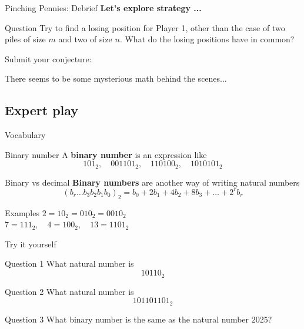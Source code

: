 \documentclass{beamer}
\begin{document}
\begin{frame}{Pinching Pennies: Debrief}
\pause
\textbf{Let's explore strategy ...}
\pause
  \begin{block}{Question}
    Try to find a losing position for Player 1, other than the case of two piles of size $m$ and two of size $n$.
    What do the losing positions have in common?
  \end{block}
\pause
  \begin{block}{Submit your conjecture:}
    \begin{center}
    \end{center}
  \end{block}
\pause
  \begin{center}
    There seems to be some mysterious math behind the scenes...
  \end{center}
\end{frame}

\subsection{Expert play}

\begin{frame}{Vocabulary}
\pause
  \begin{block}{Binary number}
    A \textbf{binary number} is an expression like
      $$101_2,\quad001101_2,\quad 110100_2,\quad 1010101_2$$
  \end{block}
\pause
  \begin{block}{Binary vs decimal}
    \textbf{Binary numbers} are another way of writing natural numbers
      $$(b_r\dots b_3b_2b_1b_0)_2 = b_0 + 2b_1 + 4b_2 + 8b_3 + \dots + 2^rb_r$$
  \end{block}
\pause
  \begin{block}{Examples}
\pause
    $2 = 10_2 = 010_2 = 0010_2$\\
\pause
    $7 = 111_2,\quad 4 = 100_2, \quad 13 = 1101_2$
  \end{block}
\end{frame}

\begin{frame}{Try it yourself}
\pause
  \begin{block}{Question 1}
    What natural number is
      $$10110_2$$
  \end{block}
\pause
  \begin{block}{Question 2}
    What natural number is
      $$101101101_2$$
  \end{block}
\pause
  \begin{block}{Question 3}
    What binary number is the same as the natural number $2025$?
  \end{block}
\end{frame}
\end{document}
